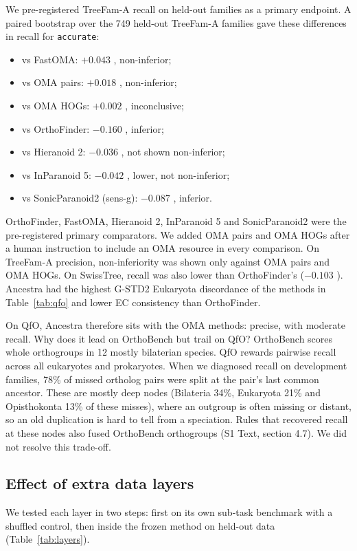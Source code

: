 We pre-registered TreeFam-A recall on held-out families as a primary endpoint. A paired bootstrap over the 749 held-out TreeFam-A families gave these differences in recall for \texttt{accurate}:
\begin{itemize}
\item vs FastOMA: $+0.043$ , non-inferior;
\item vs OMA pairs: $+0.018$ , non-inferior;
\item vs OMA HOGs: $+0.002$ , inconclusive;
\item vs OrthoFinder: $-0.160$ , inferior;
\item vs Hieranoid 2: $-0.036$ , not shown non-inferior;
\item vs InParanoid 5: $-0.042$ , lower, not non-inferior;
\item vs SonicParanoid2 (sens-g): $-0.087$ , inferior.
\end{itemize}
OrthoFinder, FastOMA, Hieranoid 2, InParanoid 5 and SonicParanoid2 were the pre-registered primary comparators. We added OMA pairs and OMA HOGs after a human instruction to include an OMA resource in every comparison. On TreeFam-A precision, non-inferiority was shown only against OMA pairs and OMA HOGs. On SwissTree, recall was also lower than OrthoFinder's ($-0.103$ ). Ancestra had the highest G-STD2 Eukaryota discordance of the methods in Table~\ref{tab:qfo} and lower EC consistency than OrthoFinder.

On QfO, Ancestra therefore sits with the OMA methods: precise, with moderate recall. Why does it lead on OrthoBench but trail on QfO? OrthoBench scores whole orthogroups in 12 mostly bilaterian species. QfO rewards pairwise recall across all eukaryotes and prokaryotes. When we diagnosed recall on development families, 78\% of missed ortholog pairs were split at the pair's last common ancestor. These are mostly deep nodes (Bilateria 34\%, Eukaryota 21\% and Opisthokonta 13\% of these misses), where an outgroup is often missing or distant, so an old duplication is hard to tell from a speciation. Rules that recovered recall at these nodes also fused OrthoBench orthogroups (S1 Text, section 4.7). We did not resolve this trade-off.

\subsection*{Effect of extra data layers}
We tested each layer in two steps: first on its own sub-task benchmark with a shuffled control, then inside the frozen method on held-out data (Table~\ref{tab:layers}).

